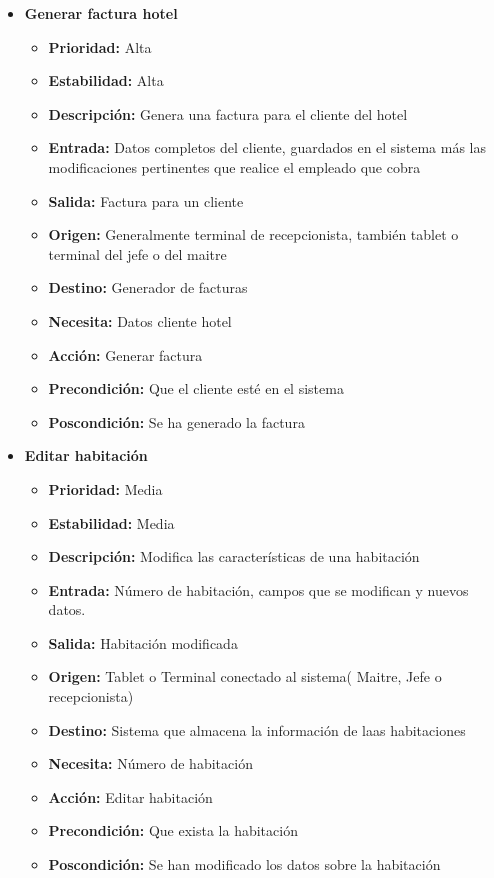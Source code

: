 \documentclass[spanish,a4paper,11pt, twoside]{report}	%
\begin{document}
\begin{itemize}
\begin{itemize}
		\end{itemize}%

		\item \textbf{Generar factura hotel} 

		\begin{itemize}

			\item \textbf{Prioridad: }Alta
			\item \textbf{Estabilidad: }Alta
			\item \textbf{Descripción: }Genera  una factura para el cliente del hotel
			\item \textbf{Entrada: }Datos completos del cliente, guardados en el sistema más las modificaciones pertinentes que realice el empleado que cobra
			\item \textbf{Salida: }Factura para un cliente
			\item \textbf{Origen: }Generalmente terminal de recepcionista, también tablet o terminal del jefe o del maitre
			\item \textbf{Destino: }Generador de facturas
			\item \textbf{Necesita: }Datos cliente hotel
			\item \textbf{Acción: }Generar factura
			\item \textbf{Precondición: }Que el cliente esté en el sistema
			\item \textbf{Poscondición: }Se ha generado la factura

		\end{itemize}%

		\item \textbf{Editar habitación} 

		\begin{itemize}

			\item \textbf{Prioridad: }Media
			\item \textbf{Estabilidad: }Media
			\item \textbf{Descripción: }Modifica las características de una habitación
			\item \textbf{Entrada: }Número de habitación, campos que se modifican y nuevos datos.
			\item \textbf{Salida: }Habitación modificada
			\item \textbf{Origen: }Tablet o Terminal conectado al sistema( Maitre, Jefe o recepcionista)
			\item \textbf{Destino: }Sistema que almacena la información de laas habitaciones
			\item \textbf{Necesita: }Número de habitación
			\item \textbf{Acción: }Editar habitación
			\item \textbf{Precondición: }Que exista la habitación
			\item \textbf{Poscondición: }Se han modificado los datos sobre la habitación


\end{itemize}
\end{itemize}
\end{document}
